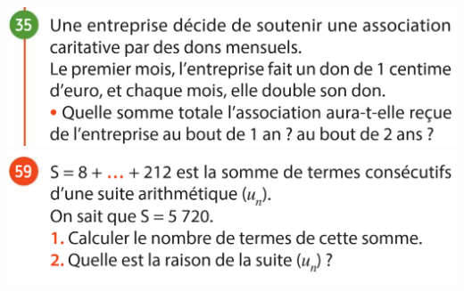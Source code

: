 \documentclass{article}
\begin{document}
\begin{center}
\includegraphics[width=\textwidth]{Exercice_6.png}
\includegraphics[width=\textwidth]{Exercice_7.png}
\end{center}
\end{document}
